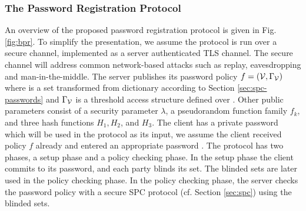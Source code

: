 
\subsubsection{The Password Registration Protocol}
An overview of the proposed password registration protocol is given in Fig. \ref{fig:bpr}. 
To simplify the presentation, we assume the protocol is run over a secure channel, \eg implemented as a server authenticated \ac{TLS} channel. 
The secure channel will address common network-based attacks such as replay, eavesdropping and man-in-the-middle. 
The server publishes its password policy $f=(\mathcal{V},\Gamma_\mathcal{V})$ where \ServerSet is a set transformed from dictionary \cD according to Section \ref{sec:spc-passwords} and $\Gamma_\mathcal{V}$ is a threshold access structure defined over \ServerSet. 
Other public parameters consist of a security parameter $\lambda$, a pseudorandom function family $f_k$, and three hash functions $H_1, H_2$, and $H_3$. 
The client has a private password \pwd which will be used in the protocol as its input, \ie we assume the client received policy $f$ already and entered an appropriate password \pwd. 
The protocol has two phases, a setup phase and a policy checking phase. 
In the setup phase the client commits to its password, and each party blinds its set. 
The blinded sets are later used in the policy checking phase. In the policy checking phase, the server checks the password policy with a secure \ac{SPC} protocol (cf. Section \ref{sec:spc}) using the blinded sets.

